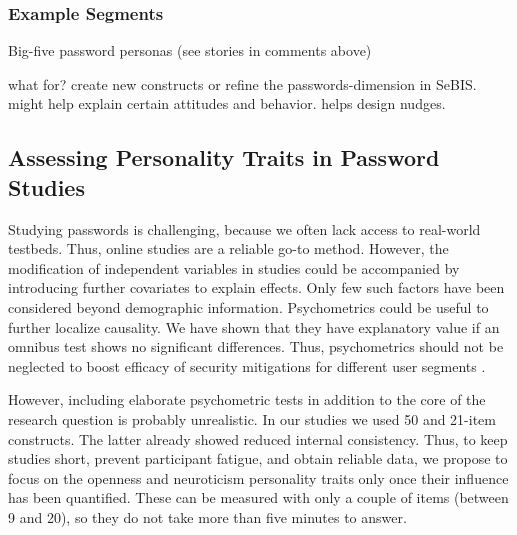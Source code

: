 



\subsubsection{Example Segments}

Big-five password personas (see stories in comments above)

what for? create new constructs or refine the passwords-dimension in SeBIS. might help explain certain attitudes and behavior. helps design nudges.




\subsection{Assessing Personality Traits in Password Studies}
Studying passwords is challenging, because we often lack access to real-world testbeds. Thus, online studies are a reliable go-to method. However, the modification of independent variables in studies could be accompanied by introducing further covariates to explain effects. Only few such factors have been considered beyond demographic information. Psychometrics could be useful to further localize causality. We have shown that they have explanatory value if an omnibus test shows no significant differences. Thus, psychometrics should not be neglected to boost efficacy of security mitigations for different user segments \cite{Egelman2015AverageUser}. 

However, including elaborate psychometric tests in addition to the core of the research question is probably unrealistic. In our studies we used 50 and 21-item constructs. The latter already showed reduced internal consistency. Thus, to keep studies short, prevent participant fatigue, and obtain reliable data, we propose to focus on the openness and neuroticism personality traits only once their influence has been quantified. These can be measured with only a couple of items (between 9 and 20), so they do not take more than five minutes to answer. 


